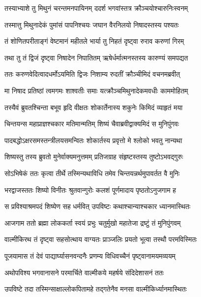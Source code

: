 \twolineshloka
{तस्याभ्याशे तु मिथुनं चरन्तमनपायिनम्}
{ददर्श भगवांस्तत्र क्रौञ्चयोश्चारुनिःस्वनम्} %

\twolineshloka
{तस्मात्तु मिथुनादेकं पुमांसं पापनिश्चयः}
{जघान वैरनिलयो निषादस्तस्य पश्यतः} %

\twolineshloka
{तं शोणितपरीताङ्गं वेष्टमानं महीतले}
{भार्या तु निहतं दृष्ट्वा रुराव करुणां गिरम्} %

\twolineshloka
{तथा तु तं द्विजं दृष्ट्वा निषादेन निपातितम्}
{ऋषेर्धर्मात्मनस्तस्य कारुण्यं समपद्यत} %

\twolineshloka
{ततः करुणवेदित्वादधर्मोऽयमिति द्विजः}
{निशाम्य रुदतीं क्रौञ्चीमिदं वचनमब्रवीत्} %

\twolineshloka
{मा निषाद प्रतिष्ठां त्वमगमः शाश्वतीः समाः}
{यत्क्रौञ्चमिथुनादेकमवधीः काममोहितम्} %

\twolineshloka
{तस्यैवं ब्रुवतश्चिन्ता बभूव हृदि वीक्षतः}
{शोकार्तेनास्य शकुनेः किमिदं व्याहृतं मया} %

\twolineshloka
{चिन्तयन्स महाप्राज्ञश्चकार मतिमान्मतिम्}
{शिष्यं चैवाब्रवीद्वाक्यमिदं स मुनिपुंगवः} %

\twolineshloka
{पादबद्धोऽक्षरसमस्तन्त्रीलयसमन्वितः}
{शोकार्तस्य प्रवृत्तो मे श्लोको भवतु नान्यथा} %

\twolineshloka
{शिष्यस्तु तस्य ब्रुवतो मुनेर्वाक्यमनुत्तमम्}
{प्रतिजग्राह संहृष्टस्तस्य तुष्टोऽभवद्गुरुः} %

\twolineshloka
{सोऽभिषेकं ततः कृत्वा तीर्थे तस्मिन्यथाविधि}
{तमेव चिन्तयन्नर्थमुपावर्तत वै मुनिः} %

\twolineshloka
{भरद्वाजस्ततः शिष्यो विनीतः श्रुतवान्गुरोः}
{कलशं पूर्णमादाय पृष्ठतोऽनुजगाम ह} %

\twolineshloka
{स प्रविश्याश्रमपदं शिष्येण सह धर्मवित्}
{उपविष्टः कथाश्चान्याश्चकार ध्यानमास्थितः} %

\twolineshloka
{आजगाम ततो ब्रह्मा लोककर्ता स्वयं प्रभुः}
{चतुर्मुखो महातेजा द्रष्टुं तं मुनिपुंगवम्} %

\twolineshloka
{वाल्मीकिरथ तं दृष्ट्वा सहसोत्थाय वाग्यतः}
{प्राञ्जलिः प्रयतो भूत्वा तस्थौ परमविस्मितः} %

\twolineshloka
{पूजयामास तं देवं पाद्यार्घ्यासनवन्दनैः}
{प्रणम्य विधिवच्चैनं पृष्ट्वानामयमव्ययम्} %

\twolineshloka
{अथोपविश्य भगवानासने परमार्चिते}
{वाल्मीकये महर्षये संदिदेशासनं ततः} %

\twolineshloka
{उपविष्टे तदा तस्मिन्साक्षाल्लोकपितामहे}
{तद्गतेनैव मनसा वाल्मीकिर्ध्यानमास्थितः} %

